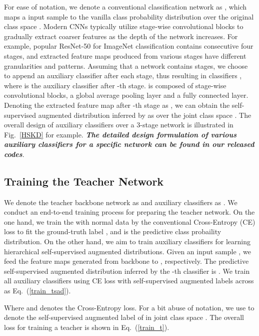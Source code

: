 \documentclass{article}
\begin{document}
For ease of notation, we denote a conventional classification network as , which maps a input sample  to the vanilla class probability distribution  over the original class space . Modern CNNs typically utilize stage-wise convolutional blocks to gradually extract coarser features as the depth of the network increases. For example, popular ResNet-50 for ImageNet classification contains consecutive four stages, and extracted feature maps produced from various stages have different granularities and patterns. Assuming that a network contains  stages, we choose to append an auxiliary classifier after each stage, thus resulting in  classifiers , where  is the auxiliary classifier after -th stage.  is composed of stage-wise convolutional blocks, a global average pooling layer and a fully connected layer. Denoting the extracted feature map after -th stage as , we can obtain the self-supervised augmented distribution inferred by  as  over the joint class space . The overall design of auxiliary classifiers over a 3-stage network is illustrated in Fig.~\ref{HSKD} for example. \textbf{\emph{The detailed design formulation of various auxiliary classifiers for a specific network can be found in our released codes}}.


\subsection{Training the Teacher Network}
We denote the teacher backbone network as  and  auxiliary classifiers as . We conduct an end-to-end training process for preparing the teacher network. On the one hand, we train the  with normal data  by the conventional Cross-Entropy (CE) loss to fit the ground-truth label , and  is the predictive class probaility distribution. On the other hand, we aim to train  auxiliary classifiers  for learning hierarchical self-supervised augmented distributions. Given an input sample , we feed the feature maps  generated from backbone  to , respectively. The predictive self-supervised augmented distribution inferred by the -th classifier  is . We train all auxiliary classifiers using  CE loss with self-supervised augmented labels across  as Eq.~(\ref{train_tsad}).

Where   and  denotes the Cross-Entropy loss. For a bit abuse of notation, we use  to denote the self-supervised augmented label of  in joint class space . The overall loss for training a teacher is shown in Eq.~(\ref{train_t}).
\end{document}
